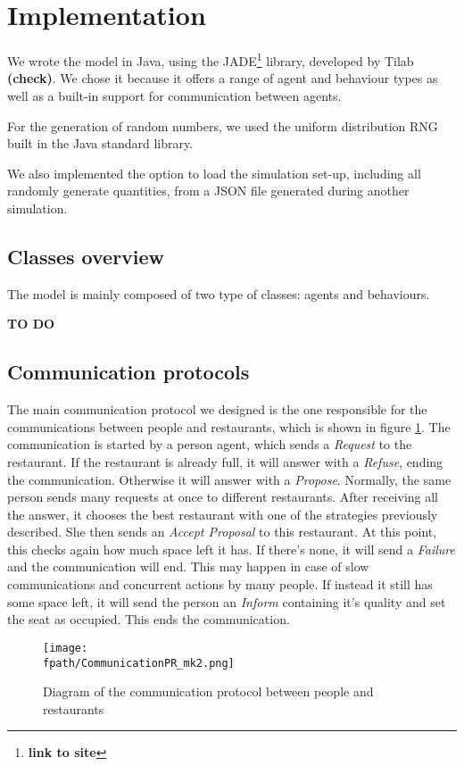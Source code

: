 \documentclass[10pt,a4paper]{article}
\newcommand{\fpath}{./Figs/}
\begin{document}
\section{Implementation}
\label{sec:implementation}
We wrote the model in Java, using the JADE\footnote{\textbf{link to site}} library, developed by Tilab \textbf{(check)}. We chose it because it offers a range of agent and behaviour types as well as a built-in support for communication between agents.

For the generation of random numbers, we used the uniform distribution RNG built in the Java standard library.

We also implemented the option to load the simulation set-up, including all randomly generate quantities, from a JSON file generated during another simulation.
\subsection{Classes overview}
The model is mainly composed of two type of classes: agents and behaviours. 

\textbf{TO DO}

\subsection{Communication protocols}
The main communication protocol we designed is the one responsible for the communications between people and restaurants, which is shown in figure \ref{fig:comm_protocol}. The communication is started by a person agent, which sends a \textit{Request} to the restaurant. If the restaurant is already full, it will answer with a \textit{Refuse}, ending the communication. Otherwise it will answer with a \textit{Propose}. Normally, the same person sends many requests at once to different restaurants. After receiving all the answer, it chooses the best restaurant with one of the strategies previously described. She then sends an \textit{Accept Proposal} to this restaurant. At this point, this checks again how much space left it has. If there's none, it will send a \textit{Failure} and the communication will end. This may happen in case of slow communications and concurrent actions by many people. If instead it still has some space left, it will send the person an \textit{Inform} containing it's quality and set the seat as occupied. This ends the communication. 
\begin{figure}
\texttt{[image: \\fpath/CommunicationPR\_mk2.png]}
\caption{Diagram of the communication protocol between people and restaurants}
\label{fig:comm_protocol}
\end{figure}
\end{document}
